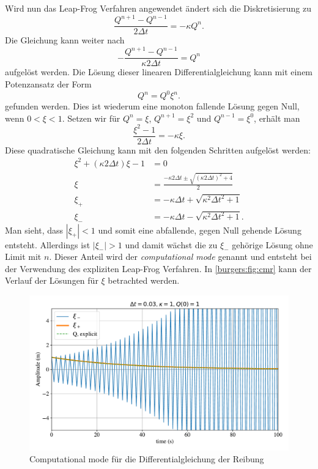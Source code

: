	\medskip
	Wird nun das Leap-Frog Verfahren angewendet \"andert sich die Diskretisierung zu
	\begin{equation}
		\frac{Q^{n+1}-Q^{n-1}}{2 \Delta t} = - \kappa Q^n.
	\end{equation}
	Die Gleichung kann weiter nach
	\begin{equation}
		-\frac{Q^{n+1}-Q^{n-1}}{\kappa 2 \Delta t} = Q^n
	\end{equation}
	aufgelöst werden.
	Die Lösung dieser linearen Differentialgleichung kann mit einem Potenzansatz der Form
		\begin{equation}
			Q^n = Q^0\xi ^n.
			\label{burgers:eq_cm}
		\end{equation}
	gefunden werden.
	Dies ist wiederum eine monoton fallende L\"osung gegen Null, wenn $0 < \xi < 1$.
	Setzen wir f\"ur $Q^n = \xi$, $Q^{n+1} = \xi^2$ und $Q^{n-1} = \xi^0$,
	erhält man
	\begin{equation}
		\frac{\xi^2 -1}{2\Delta t} =  -\kappa \xi.
	\end{equation}
    Diese quadratische Gleichung kann mit den folgenden Schritten aufgelöst werden:
\begin{subequations}
    \begin{align}
            \xi^2 + (\kappa 2 \Delta t) \xi  -1 &= 0 \\
            \xi &= \frac{- \kappa 2 \Delta t \pm \sqrt{(\kappa 2 \Delta t)^2 + 4}}{2}\\
            \xi_+ &= - \kappa\Delta t + \sqrt{\kappa^2 \Delta t^2 + 1}\\
            \xi_- &= - \kappa\Delta t - \sqrt{\kappa^2 \Delta t^2 + 1}.
        \end{align}
    \end{subequations}
	Man sieht, dass $|\xi_+| < 1$ und somit eine abfallende, gegen Null gehende L\"osung entsteht.
	Allerdings ist 	$|\xi_-| > 1$ und damit w\"achst die zu $\xi_-$ gehörige Lösung ohne Limit mit $n$.
	Dieser Anteil wird der  \textit{computational mode} genannt und entsteht bei der Verwendung des expliziten Leap-Frog Verfahren.
	In \autoref{burgers:fig:cmr} kann der Verlauf der Lösungen für $\xi$ betrachted werden.
	\begin{figure}
	\centering
	\includegraphics[width=1\textwidth]{papers/burgers/BurgersEquation/comp_mode.pdf}
	\caption{Computational mode für die Differentialgleichung der Reibung}
	\label{burgers:fig:cmr}
	\end{figure}

